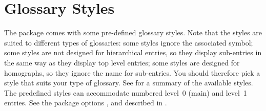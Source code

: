 \documentclass[report]{nlctdoc}
\begin{document}
\chapter{Glossary Styles}
\label{sec:styles}
The  package comes with some pre-defined
glossary styles. Note that the styles are suited to different
types of glossaries: some styles ignore the associated
symbol; some styles are not designed for hierarchical entries,
so they display sub-entries in the same way as they display top
level entries; some styles are designed for homographs, so they 
ignore the name for sub-entries. You should therefore pick a style 
that suits your type of glossary. See  for
a summary of the available styles. The predefined styles can
accommodate numbered level~0 (main) and level~1 entries. See the
package options ,  and
 described in
.
\end{document}
